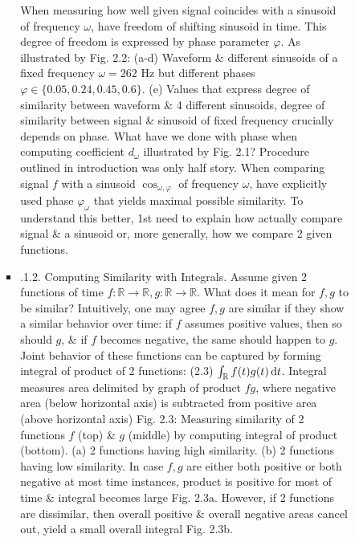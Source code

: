 \documentclass{article}
\begin{document}
\begin{itemize}
\begin{itemize}
\begin{itemize}
\begin{itemize}
				When measuring how well given signal coincides with a sinusoid of frequency $\omega$, have freedom of shifting sinusoid in time. This degree of freedom is expressed by phase parameter $\varphi$. As illustrated by {\sf Fig. 2.2: (a-d) Waveform \& different sinusoids of a fixed frequency $\omega = 262$ Hz but different phases $\varphi\in\{0.05,0.24,0.45,0.6\}$. (e) Values that express degree of similarity between waveform \& 4 different sinusoids}, degree of similarity between signal \& sinusoid of fixed frequency crucially depends on phase. What have we done with phase when computing coefficient $d_\omega$ illustrated by {\sf Fig. 2.1}? Procedure outlined in introduction was only half story. When comparing signal $f$ with a sinusoid $\cos_{\omega,\varphi}$ of frequency $\omega$, have explicitly used phase $\varphi_\omega$ that yields maximal possible similarity. To understand this better, 1st need to explain how actually compare signal \& a sinusoid or, more generally, how we compare 2 given functions.
				\item {.1.2. Computing Similarity with Integrals.} Assume given 2 functions of time $f:\mathbb{R}\to\mathbb{R},g:\mathbb{R}\to\mathbb{R}$. What does it mean for $f,g$ to be similar? Intuitively, one may agree $f,g$ are similar if they show a similar behavior over time: if $f$ assumes positive values, then so should $g$, \& if $f$ becomes negative, the same should happen to $g$. Joint behavior of these functions can be captured by forming integral of product of 2 functions: (2.3) $\int_\mathbb{R} f(t)g(t)\,{\rm d}t$. Integral measures area delimited by graph of product $fg$, where negative area (below horizontal axis) is subtracted from positive area (above horizontal axis) {\sf Fig. 2.3: Measuring similarity of 2 functions $f$ (top) \& $g$ (middle) by computing integral of product (bottom). (a) 2 functions having high similarity. (b) 2 functions having low similarity.} In case $f,g$ are either both positive or both negative at most time instances, product is positive for most of time \& integral becomes large {\sf Fig. 2.3a}. However, if 2 functions are dissimilar, then overall positive \& overall negative areas cancel out, yield a small overall integral {\sf Fig. 2.3b}.
				

\end{itemize}
\end{itemize}
\end{itemize}
\end{itemize}
\end{document}
